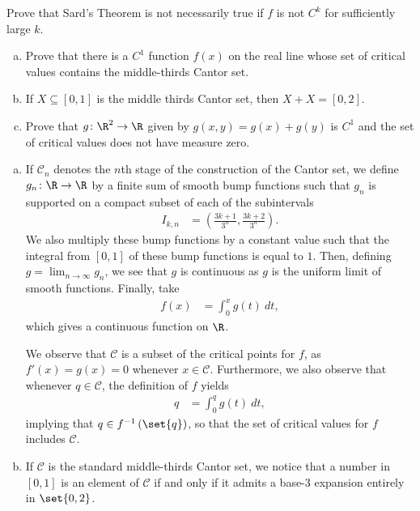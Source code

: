 \documentclass[10pt]{mypackage}
\begin{document}
\begin{problem}[Problem 4]
  Prove that Sard's Theorem is not necessarily true if $f$ is not $C^{k}$ for sufficiently large $k$.
  \begin{enumerate}[(a)]
    \item Prove that there is a $C^{1}$ function $f(x)$ on the real line whose set of critical values contains the middle-thirds Cantor set.
    \item If $X\subseteq [0,1]$ is the middle thirds Cantor set, then $X+X = [0,2]$.
    \item Prove that $g\colon \R^{2}\rightarrow \R$ given by $g(x,y) = g(x) + g(y)$ is $C^{1}$ and the set of critical values does not have measure zero.
  \end{enumerate}
\end{problem}
\begin{solution}\hfill
  \begin{enumerate}[(a)]
    \item If $\mathcal{C}_n$ denotes the $n$th stage of the construction of the Cantor set, we define $g_n\colon \R\rightarrow \R$ by a finite sum of smooth bump functions such that $g_n$ is supported on a compact subset of each of the subintervals
      \begin{align*}
        I_{k,n} &= \left( \frac{3k + 1}{3^{n}},\frac{3k+2}{3^{n}} \right).
      \end{align*}
      We also multiply these bump functions by a constant value such that the integral from $[0,1]$ of these bump functions is equal to $1$. Then, defining $g = \lim_{n\rightarrow\infty}g_n$, we see that $g$ is continuous as $g$ is the uniform limit of smooth functions. Finally, take
      \begin{align*}
        f(x) &= \int_{0}^{x} g(t)\:dt,
      \end{align*}
      which gives a continuous function on $\R$.\newline

      We observe that $\mathcal{C}$ is a subset of the critical points for $f$, as $f'(x) = g(x) = 0$ whenever $x\in \mathcal{C}$. Furthermore, we also observe that whenever $q\in \mathcal{C}$, the definition of $f$ yields
      \begin{align*}
        q &= \int_{0}^{q} g(t)\:dt,
      \end{align*}
      implying that $q\in f^{-1}\left( \set{q} \right)$, so that the set of critical values for $f$ includes $\mathcal{C}$.
    \item If $\mathcal{C}$ is the standard middle-thirds Cantor set, we notice that a number in $[0,1]$ is an element of $\mathcal{C}$ if and only if it admits a base-3 expansion entirely in $\set{0,2}$.\newline


\end{enumerate}
\end{solution}
\end{document}

